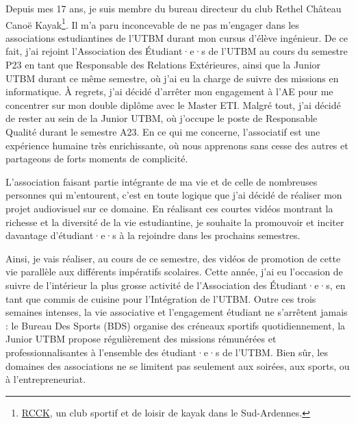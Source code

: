 
Depuis mes 17 ans, je suis membre du bureau directeur du club Rethel Château Canoë Kayak\footnote{\href{https://rcck-ardennes.fr}{RCCK}, un club sportif et de loisir de kayak dans le Sud-Ardennes.}.
Il m'a paru inconcevable de ne pas m'engager dans les associations estudiantines de l'\gls{UTBM} durant mon cursus d'élève ingénieur.
De ce fait, j'ai rejoint l'Association des Étudiant·e·s de l'\gls{UTBM} au cours du semestre P23 en tant que Responsable des Relations Extérieures, ainsi que la Junior \gls{UTBM} durant ce même semestre, où j'ai eu la charge de suivre des missions en informatique.
À regrets, j'ai décidé d'arrêter mon engagement à l'\gls{AE} pour me concentrer sur mon double diplôme avec le Master ETI. Malgré tout, j'ai décidé de rester au sein de la Junior \gls{UTBM}, où j'occupe le poste de Responsable Qualité durant le semestre A23.
En ce qui me concerne, l'associatif est une expérience humaine très enrichissante, où nous apprenons sans cesse des autres et partageons de forts moments de complicité.

L'association faisant partie intégrante de ma vie et de celle de nombreuses personnes qui m'entourent, c'est en toute logique que j'ai décidé de réaliser mon projet audiovisuel sur ce domaine.
En réalisant ces courtes vidéos montrant la richesse et la diversité de la vie estudiantine, je souhaite la promouvoir et inciter davantage d'étudiant·e·s à la rejoindre dans les prochains semestres.

Ainsi, je vais réaliser, au cours de ce semestre, des vidéos de promotion de cette vie parallèle aux différents impératifs scolaires.
Cette année, j'ai eu l'occasion de suivre de l'intérieur la plus grosse activité de l'Association des Étudiant·e·s, en tant que commis de cuisine pour l'Intégration de l'\gls{UTBM}.
Outre ces trois semaines intenses, la vie associative et l'engagement étudiant ne s'arrêtent jamais : le Bureau Des Sports (BDS) organise des créneaux sportifs quotidiennement, la Junior \gls{UTBM} propose régulièrement des missions rémunérées et professionnalisantes à l'ensemble des étudiant·e·s de l'\gls{UTBM}.
Bien sûr, les domaines des associations ne se limitent pas seulement aux soirées, aux sports, ou à l'entrepreneuriat.